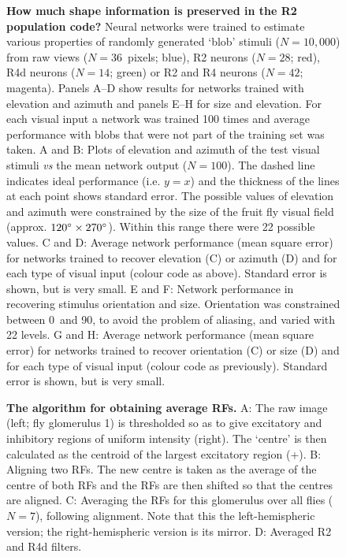 \begin{figure}[htp]
	\caption{
		{\bf How much shape information is preserved in the R2 population code?}
		Neural networks were trained to estimate various properties of randomly generated `blob' stimuli ($N=10,000$) from raw views ($N=36$~pixels; blue), R2 neurons ($N=28$; red), R4d neurons ($N=14$; green) or R2 and R4 neurons ($N=42$; magenta). Panels A--D show results for networks trained with elevation and azimuth and panels E--H for size and elevation. For each visual input a network was trained 100 times and average performance with blobs that were not part of the training set was taken.
		A and B: Plots of elevation and azimuth of the test visual stimuli \emph{vs} the mean network output ($N=100$). The dashed line indicates ideal performance (i.e. $y=x$) and the thickness of the lines at each point shows standard error.
		The possible values of elevation and azimuth were constrained by the size of the fruit fly visual field (approx. $120\degree \times 270\degree$). Within this range there were 22 possible values.
		C and D: Average network performance (mean square error) for networks trained to recover elevation (C) or azimuth (D) and for each type of visual input (colour code as above). Standard error is shown, but is very small.
		E and F: Network performance in recovering stimulus orientation and size. Orientation was constrained between 0\degree\ and 90\degree, to avoid the problem of aliasing, and varied with 22 levels.
		G and H: Average network performance (mean square error) for networks trained to recover orientation (C) or size (D) and for each type of visual input (colour code as previously). Standard error is shown, but is very small.
	}
	\label{fig:elazorsi}
\end{figure}

\begin{figure}[htp]
	\caption{
		{\bf The algorithm for obtaining average \acp{RF}.}
		A: The raw image (left; fly glomerulus 1) is thresholded so as to give excitatory and inhibitory regions of uniform intensity (right).
		The `centre' is then calculated as the centroid of the largest excitatory region (+).
		B: Aligning two \acp{RF}.
		The new centre is taken as the average of the centre of both \acp{RF} and the \acp{RF} are then shifted so that the centres are aligned.
		C: Averaging the \acp{RF} for this glomerulus over all flies ($N=7$), following alignment.
		Note that this the left-hemispheric version; the right-hemispheric version is its mirror.
		D: Averaged R2 and R4d filters.
	}
	\label{fig:avkernels}
\end{figure}

